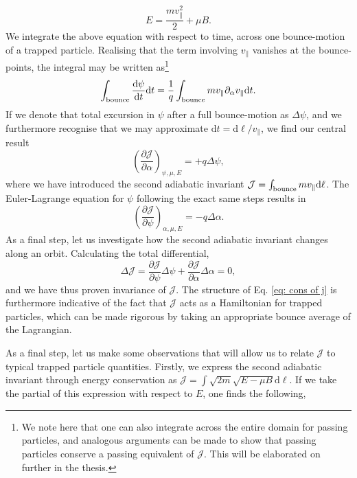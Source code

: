 \begin{equation}
    E = \frac{m v_\parallel^2}{2} + \mu B.
\end{equation}
We integrate the above equation with respect to time, across one bounce-motion of a trapped particle. Realising that the term involving $v_\parallel$ vanishes at the bounce-points, the integral may be written as\footnote{We note here that one can also integrate across the entire domain for passing particles, and analogous arguments can be made to show that passing particles conserve a passing equivalent of $\mathcal{J}$. This will be elaborated on further in the thesis.}
\begin{equation}
    \int_{\rm bounce} \frac{\mathrm{d}\psi}{\mathrm{d}t} \mathrm{d}t = \frac{1}{q} \int_{\rm bounce} m v_\parallel  \partial_\alpha v_\parallel \mathrm{d}t.
    \label{eq: euler-lagrange for psi}
\end{equation}
If we denote that total excursion in $\psi$ after a full bounce-motion as $\Delta \psi$, and we furthermore recognise that we may approximate $\mathrm{d}t = \mathrm{d} \ell/v_\parallel$, we find our central result
\begin{equation}
    \left( \frac{\partial \mathcal{J}}{\partial \alpha} \right)_{\psi,\mu,E} = + q \Delta\psi,
    \label{eq: dJdalpha}
\end{equation}
where we have introduced the second adiabatic invariant $\mathcal{J} = \int_{\rm bounce} m v_\parallel \mathrm{d}\ell$. The Euler-Lagrange equation for $\psi$ following the exact same steps results in
\begin{equation}
    \left( \frac{\partial \mathcal{J}}{\partial \psi} \right)_{\alpha,\mu,E} = - q \Delta\alpha.
    \label{eq: dJdpsi}
\end{equation}
As a final step, let us investigate how the second adiabatic invariant changes along an orbit. Calculating the total differential,
\begin{equation}
    \Delta \mathcal{J} = \frac{\partial \mathcal{J}}{\partial \psi} \Delta \psi + \frac{\partial \mathcal{J}}{\partial \alpha} \Delta \alpha = 0,
    \label{eq: cons of j}
\end{equation}
and we have thus proven invariance of $\mathcal{J}$. The structure of Eq. \eqref{eq: cons of j} is furthermore indicative of the fact that $\mathcal{J}$ acts as a Hamiltonian for trapped particles, which can be made rigorous by taking an appropriate bounce average of the Lagrangian. \par 
As a final step, let us make some observations that will allow us to relate $\mathcal{J}$ to typical trapped particle quantities. Firstly, we express the second adiabatic invariant through energy conservation as $\mathcal{J} = \int \sqrt{2m} \sqrt{E - \mu B} \mathrm{d} \ell$. If we take the partial of this expression with respect to $E$, one finds the following,
